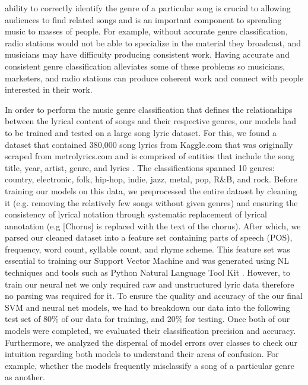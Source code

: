 \documentclass[journal]{IEEEtran}
\begin{document}
 ability to correctly identify the genre of a particular song is crucial to allowing audiences to find related songs and is an important component to spreading music to masses of people. For example, without accurate genre classification, radio stations would not be able to specialize in the material they broadcast, and musicians may have difficulty producing consistent work. Having accurate and consistent genre classification alleviates some of these problems so musicians, marketers, and radio stations can produce coherent work and connect with people interested in their work. 
\par In order to perform the music genre classification that defines the relationships between the lyrical content of songs and their respective genres, our models had to be trained and tested on a large song lyric dataset. For this, we found a dataset that contained 380,000 song lyrics from Kaggle.com that was originally scraped from metrolyrics.com and is comprised of entities that include the song title, year, artist, genre, and lyrics \cite{KaggleDataset}. The classifications spanned 10 genres: country, electronic, folk, hip-hop, indie, jazz, metal, pop, R\&B, and rock. Before training our models on this data, we preprocessed the entire dataset by cleaning it (e.g. removing the relatively few songs without given genres) and ensuring the consistency of lyrical notation through systematic replacement of lyrical annotation (e.g [Chorus] is replaced with the text of the chorus). After which, we parsed our cleaned dataset into a feature set containing parts of speech (POS), frequency, word count, syllable count, and rhyme scheme. This feature set was essential to training our Support Vector Machine and was generated using NL techniques and tools such as Python Natural Language Tool Kit \cite{NLTK}. However, to train our neural net we only required raw and unstructured lyric data therefore no parsing was required for it. To ensure the quality and accuracy of the our final SVM and neural net models, we had to breakdown our data into the following test set of 80\% of our data for training, and 20\% for testing. Once both of our models were completed, we evaluated their classification precision and accuracy. Furthermore, we analyzed the dispersal of model errors over classes to check our intuition regarding both models to understand their areas of confusion. For example, whether the models frequently misclassify a song of a particular genre as another. \par
\end{document}

